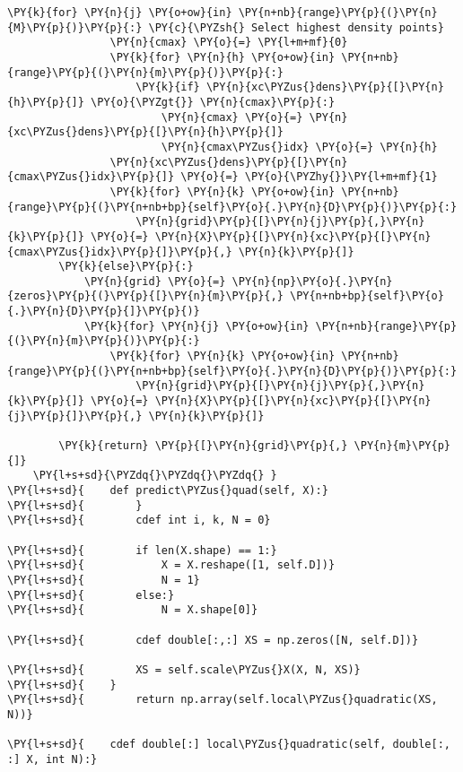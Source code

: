 \begin{Verbatim}[commandchars=\\\{\}]
            \PY{k}{for} \PY{n}{j} \PY{o+ow}{in} \PY{n+nb}{range}\PY{p}{(}\PY{n}{M}\PY{p}{)}\PY{p}{:} \PY{c}{\PYZsh{} Select highest density points}
                \PY{n}{cmax} \PY{o}{=} \PY{l+m+mf}{0}
                \PY{k}{for} \PY{n}{h} \PY{o+ow}{in} \PY{n+nb}{range}\PY{p}{(}\PY{n}{m}\PY{p}{)}\PY{p}{:}
                    \PY{k}{if} \PY{n}{xc\PYZus{}dens}\PY{p}{[}\PY{n}{h}\PY{p}{]} \PY{o}{\PYZgt{}} \PY{n}{cmax}\PY{p}{:}
                        \PY{n}{cmax} \PY{o}{=} \PY{n}{xc\PYZus{}dens}\PY{p}{[}\PY{n}{h}\PY{p}{]}
                        \PY{n}{cmax\PYZus{}idx} \PY{o}{=} \PY{n}{h}
                \PY{n}{xc\PYZus{}dens}\PY{p}{[}\PY{n}{cmax\PYZus{}idx}\PY{p}{]} \PY{o}{=} \PY{o}{\PYZhy{}}\PY{l+m+mf}{1}
                \PY{k}{for} \PY{n}{k} \PY{o+ow}{in} \PY{n+nb}{range}\PY{p}{(}\PY{n+nb+bp}{self}\PY{o}{.}\PY{n}{D}\PY{p}{)}\PY{p}{:}
                    \PY{n}{grid}\PY{p}{[}\PY{n}{j}\PY{p}{,}\PY{n}{k}\PY{p}{]} \PY{o}{=} \PY{n}{X}\PY{p}{[}\PY{n}{xc}\PY{p}{[}\PY{n}{cmax\PYZus{}idx}\PY{p}{]}\PY{p}{,} \PY{n}{k}\PY{p}{]}
        \PY{k}{else}\PY{p}{:}
            \PY{n}{grid} \PY{o}{=} \PY{n}{np}\PY{o}{.}\PY{n}{zeros}\PY{p}{(}\PY{p}{[}\PY{n}{m}\PY{p}{,} \PY{n+nb+bp}{self}\PY{o}{.}\PY{n}{D}\PY{p}{]}\PY{p}{)}
            \PY{k}{for} \PY{n}{j} \PY{o+ow}{in} \PY{n+nb}{range}\PY{p}{(}\PY{n}{m}\PY{p}{)}\PY{p}{:} 
                \PY{k}{for} \PY{n}{k} \PY{o+ow}{in} \PY{n+nb}{range}\PY{p}{(}\PY{n+nb+bp}{self}\PY{o}{.}\PY{n}{D}\PY{p}{)}\PY{p}{:}
                    \PY{n}{grid}\PY{p}{[}\PY{n}{j}\PY{p}{,}\PY{n}{k}\PY{p}{]} \PY{o}{=} \PY{n}{X}\PY{p}{[}\PY{n}{xc}\PY{p}{[}\PY{n}{j}\PY{p}{]}\PY{p}{,} \PY{n}{k}\PY{p}{]}
   
        \PY{k}{return} \PY{p}{[}\PY{n}{grid}\PY{p}{,} \PY{n}{m}\PY{p}{]}
    \PY{l+s+sd}{\PYZdq{}\PYZdq{}\PYZdq{} }
\PY{l+s+sd}{    def predict\PYZus{}quad(self, X):}
\PY{l+s+sd}{        }
\PY{l+s+sd}{        cdef int i, k, N = 0}

\PY{l+s+sd}{        if len(X.shape) == 1:}
\PY{l+s+sd}{            X = X.reshape([1, self.D])}
\PY{l+s+sd}{            N = 1}
\PY{l+s+sd}{        else:}
\PY{l+s+sd}{            N = X.shape[0]}

\PY{l+s+sd}{        cdef double[:,:] XS = np.zeros([N, self.D])}

\PY{l+s+sd}{        XS = self.scale\PYZus{}X(X, N, XS)}
\PY{l+s+sd}{    }
\PY{l+s+sd}{        return np.array(self.local\PYZus{}quadratic(XS, N))}

\PY{l+s+sd}{    cdef double[:] local\PYZus{}quadratic(self, double[:, :] X, int N):}


\end{Verbatim}
